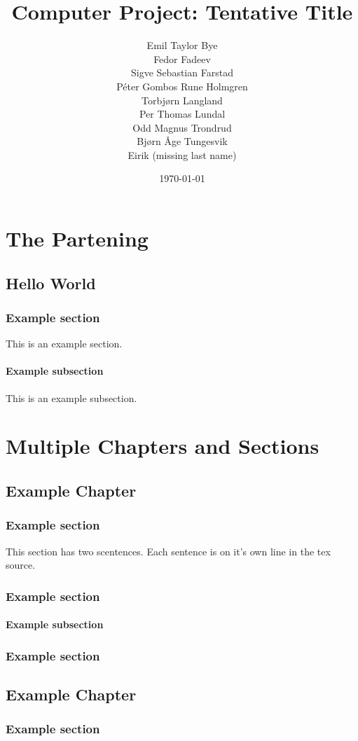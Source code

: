 \documentclass{report}
\title{Computer Project: Tentative Title}
\date{\today}
\author{Emil Taylor Bye
     \\ Fedor Fadeev
     \\ Sigve Sebastian Farstad
     \\ Péter Gombos Rune Holmgren
     \\ Torbjørn Langland
     \\ Per Thomas Lundal
     \\ Odd Magnus Trondrud
     \\ Bjørn Åge Tungesvik
     \\ Eirik (missing last name)
}
\begin{document}
\maketitle

\part{The Partening}

\chapter{Hello World}

\section{Example section}

This is an example section.

\subsection{Example subsection}

This is an example subsection.

\part{Multiple Chapters and Sections}

\chapter{Example Chapter}

\section{Example section}

This section has two scentences.
Each sentence is on it's own line in the tex source.

\section{Example section}

\subsection{Example subsection}

\section{Example section}

\chapter{Example Chapter}

\section{Example section}
\end{document}
